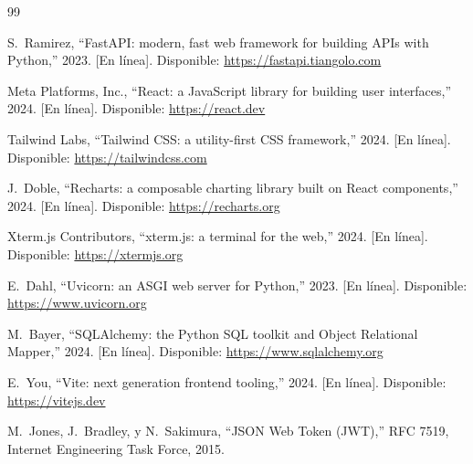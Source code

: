 \begin{thebibliography}{99}

S.~Ramirez, ``FastAPI: modern, fast web framework for building APIs with Python,''
2023. [En línea]. Disponible: \url{https://fastapi.tiangolo.com}

Meta Platforms, Inc., ``React: a JavaScript library for building user interfaces,''
2024. [En línea]. Disponible: \url{https://react.dev}

Tailwind Labs, ``Tailwind CSS: a utility-first CSS framework,''
2024. [En línea]. Disponible: \url{https://tailwindcss.com}

J.~Doble, ``Recharts: a composable charting library built on React components,''
2024. [En línea]. Disponible: \url{https://recharts.org}

Xterm.js Contributors, ``xterm.js: a terminal for the web,''
2024. [En línea]. Disponible: \url{https://xtermjs.org}

E.~Dahl, ``Uvicorn: an ASGI web server for Python,''
2023. [En línea]. Disponible: \url{https://www.uvicorn.org}

M.~Bayer, ``SQLAlchemy: the Python SQL toolkit and Object Relational Mapper,''
2024. [En línea]. Disponible: \url{https://www.sqlalchemy.org}

E.~You, ``Vite: next generation frontend tooling,''
2024. [En línea]. Disponible: \url{https://vitejs.dev}

M.~Jones, J.~Bradley, y N.~Sakimura, ``JSON Web Token (JWT),''
RFC 7519, Internet Engineering Task Force, 2015.

\end{thebibliography}


